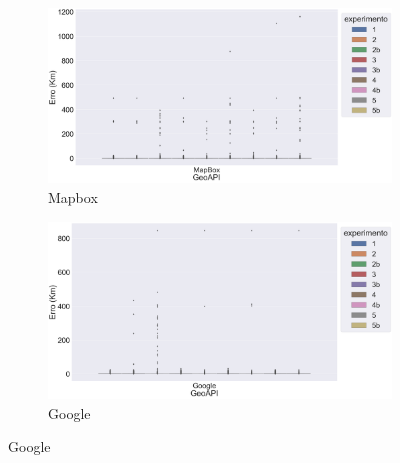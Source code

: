 \begin{figure}[ht]
  \centering
  \begin{subfigure}[b]{0.45\textwidth}
    \includegraphics[width=\textwidth]{Figuras/boxplotApiMapbox.png}
    \caption{Mapbox}
    \label{fig:boxplot-api-mapbox}
  \end{subfigure}
  \hfill
  \begin{subfigure}[b]{0.45\textwidth}
    \includegraphics[width=\textwidth]{Figuras/boxplotApiGoogle.png}
    \caption{Google}
    \label{fig:boxplot-api-google}
  \end{subfigure}


\end{figure}
